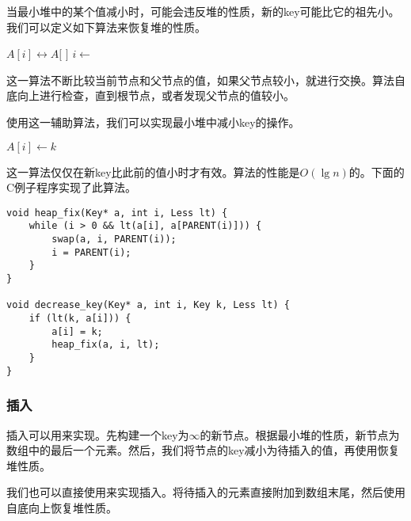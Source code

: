 \documentclass[UTF8]{article}
\begin{document}
当最小堆中的某个值减小时，可能会违反堆的性质，新的key可能比它的祖先小。我们可以定义如下算法来恢复堆的性质。

\begin{algorithmic}[1]
    \State {} $A[i] \leftrightarrow A[$  $]$
    \State $i \gets$  
  \EndWhile
\EndFunction
\end{algorithmic}

这一算法不断比较当前节点和父节点的值，如果父节点较小，就进行交换。算法自底向上进行检查，直到根节点，或者发现父节点的值较小。

使用这一辅助算法，我们可以实现最小堆中减小key的操作。

\begin{algorithmic}[1]
    \State $A[i] \gets k$
    \State {}
  \EndIf
\EndFunction
\end{algorithmic}

这一算法仅仅在新key比此前的值小时才有效。算法的性能是$O(\lg n)$的。下面的C例子程序实现了此算法。

\lstset{language=C}
\begin{lstlisting}
void heap_fix(Key* a, int i, Less lt) {
    while (i > 0 && lt(a[i], a[PARENT(i)])) {
        swap(a, i, PARENT(i));
        i = PARENT(i);
    }
}

void decrease_key(Key* a, int i, Key k, Less lt) {
    if (lt(k, a[i])) {
        a[i] = k;
        heap_fix(a, i, lt);
    }
}
\end{lstlisting}

\subsubsection{插入}

插入可以用来实现\cite{CLRS}。先构建一个key为$\infty$的新节点。根据最小堆的性质，新节点为数组中的最后一个元素。然后，我们将节点的key减小为待插入的值，再使用恢复堆性质。

我们也可以直接使用来实现插入。将待插入的元素直接附加到数组末尾，然后使用自底向上恢复堆性质。

\begin{algorithmic}[1]
  \State {}
  \State {}
\EndFunction
\end{algorithmic}
\end{document}
